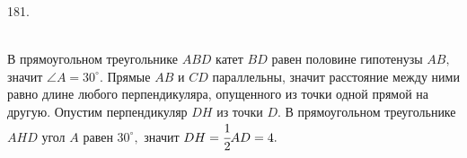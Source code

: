 181. \begin{figure}[ht!]
\end{figure}\\
В прямоугольном треугольнике $ABD$ катет $BD$ равен половине гипотенузы $AB,$ значит $\angle A=30^\circ.$ Прямые $AB$ и $CD$ параллельны, значит расстояние между ними равно длине любого перпендикуляра, опущенного из точки одной прямой на другую. Опустим перпендикуляр $DH$ из точки $D.$ В прямоугольном треугольнике $AHD$ угол $A$ равен $30^\circ,$ значит $DH=\cfrac{1}{2}AD=4.$\\
